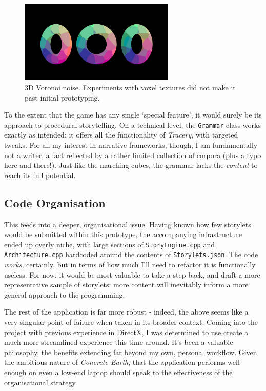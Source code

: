 \documentclass[a4paper, 11pt]{article}
\begin{document}
\begin{flushleft}
\vspace{5pt}\noindent
\begin{figure}[h]
\centering
\includegraphics[width=0.66\textwidth]{Euclidean Voronoi Voxel}
\caption{3D Voronoi noise. Experiments with voxel textures did not make it past initial prototyping.}
\label{Euclidean Voronoi Voxel}
\end{figure}

\vspace{5pt}\noindent
To the extent that the game has any single `special feature',  it would surely be its approach to procedural storytelling. On a technical level, the \texttt{Grammar} class works exactly as intended: it offers all the functionality of \textit{Tracery}, with targeted tweaks. For all my interest in narrative frameworks, though, I am fundamentally not a writer, a fact reflected by a rather limited collection of corpora (plus a typo here and there!). Just like the marching cubes, the grammar lacks the \textit{content} to reach its full potential. 

\subsection{Code Organisation}

This feeds into a deeper, organisational issue. Having known how few storylets would be submitted within this prototype, the accompanying infrastructure ended up overly niche, with large sections of \texttt{StoryEngine.cpp} and \texttt{Architecture.cpp} hardcoded around the contents of \texttt{Storylets.json}. The code \textit{works}, certainly, but in terms of how much I'll need to refactor it is functionally useless. For now, it would be most valuable to take a step back, and draft a more representative sample of storylets: more content will inevitably inform a more general approach to the programming.

\vspace{5pt}\noindent
The rest of the application is far more robust - indeed, the above seems like a very singular point of failure when taken in its broader context. Coming into the project with previous experience in DirectX, I was determined to use create a much more streamlined experience this time around. It's been a valuable philosophy, the benefits extending far beyond my own, personal workflow. Given the ambitious nature of \textit{Concrete Earth}, that the application performs well enough on even a low-end laptop should speak to the effectiveness of the organisational strategy.


\end{flushleft}
\end{document}
